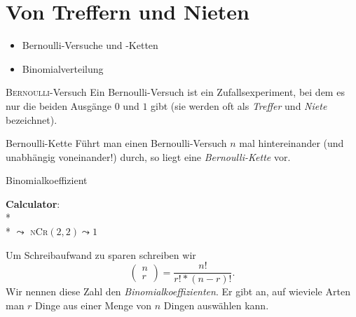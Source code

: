 \chapter{Von Treffern und Nieten}
\begin{inhalt}
  \begin{itemize}
    \item Bernoulli-Versuche und -Ketten
    \item Binomialverteilung
  \end{itemize}
\end{inhalt}

\begin{bla}{\textsc{Bernoulli}-Versuch}
  Ein Bernoulli-Versuch ist ein Zufallsexperiment, bei dem es nur die beiden Ausgänge $0$ und $1$ gibt (sie werden oft als \emph{Treffer} und \emph{Niete} bezeichnet).
\end{bla}

\begin{bla}{Bernoulli-Kette}
  Führt man einen Bernoulli-Versuch $n$ mal hintereinander (und unabhängig voneinander!) durch, so liegt eine \emph{Bernoulli-Kette} vor.
\end{bla}

\begin{bla}{Binomialkoeffizient}
  \begin{marginfigure}[4em]
    \begin{tcolorbox}[colback=white!95!black,colframe=white!75!black,title=CAS:,arc=0mm]
      \begin{scriptsize}
        \textbf{Calculator}: \\*
         \\*
        \( \leadsto \) \textsc{nCr}\( (2, 2) \leadsto 1 \)
      \end{scriptsize}
    \end{tcolorbox}
  \end{marginfigure}
  Um Schreibaufwand zu sparen schreiben wir
  \begin{equation*}
    \begin{pmatrix} n \\ r \end{pmatrix} = \frac{n!}{r!*(n-r)!}\text{.}
  \end{equation*}
  Wir nennen diese Zahl den \emph{Binomialkoeffizienten}. Er gibt an, auf wieviele Arten man $r$ Dinge aus einer Menge von $n$ Dingen auswählen kann.
\end{bla}

